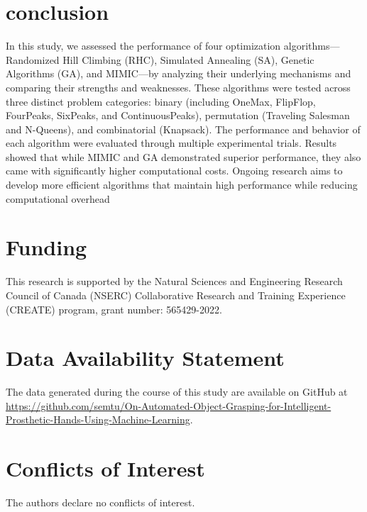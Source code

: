 \section{conclusion}
In this study, we assessed the performance of four optimization algorithms—Randomized Hill Climbing (RHC), Simulated Annealing (SA), Genetic Algorithms (GA), and MIMIC—by analyzing their underlying mechanisms and comparing their strengths and weaknesses. These algorithms were tested across three distinct problem categories: binary (including OneMax, FlipFlop, FourPeaks, SixPeaks, and ContinuousPeaks), permutation (Traveling Salesman and N-Queens), and combinatorial (Knapsack). The performance and behavior of each algorithm were evaluated through multiple experimental trials. Results showed that while MIMIC and GA demonstrated superior performance, they also came with significantly higher computational costs. Ongoing research aims to develop more efficient algorithms that maintain high performance while reducing computational overhead

\section*{Funding}
This research is supported by the Natural Sciences and Engineering Research Council of Canada (NSERC) Collaborative Research and Training Experience (CREATE) program, grant number: 565429-2022.

\section*{Data Availability Statement}
The data generated during the course of this study are available on GitHub at \url{https://github.com/semtu/On-Automated-Object-Grasping-for-Intelligent-Prosthetic-Hands-Using-Machine-Learning}.

\section*{Conflicts of Interest}
The authors declare no conflicts of interest.
